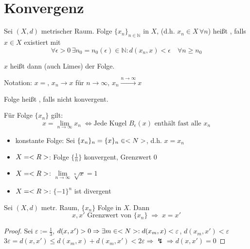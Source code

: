 \section{Konvergenz}\setcounter{theorem}{0}
\begin{definition}[konvergent]
	Sei $(X,d)$ metrischer Raum. Folge $\{x_n\}_{n\in\mathbb{N}}$ in $X$, (d.h. $x_n\in X\,\forall n$) heißt , falls $x\in X$ existiert mit \[\forall \epsilon > 0 \,\exists n_0=n_0(\epsilon)\in\mathbb{N}: d(x_n, x) < \epsilon\quad \forall n\ge n_0\]
	
	$x$ heißt dann  (auch Limes) der Folge.
	
	Notation: $x=$, $x_n\rightarrow x$ für $n\rightarrow\infty$, $x_n \overset{n\rightarrow\infty}{\longrightarrow}x$
	
	Folge heißt , falls nicht konvergent.
\end{definition}

\begin{conclusion}
	Für Folge $\{x_n\}$ gilt: \[ x=\lim\limits_{n\rightarrow\infty}x_n \;\Leftrightarrow \text{Jede Kugel $B_\epsilon(x)$ enthält fast alle $x_n$} \]
\end{conclusion}

\begin{example}
	\begin{itemize}
		\item konstante Folge: Sei $\{x_n\}_n=\{x\}_n\in<N>$, d.h. $x=x_n$
		\item $X=<R>$: Folge $\{\frac{1}{n}\}$ konvergent, Grenzwert 0
		\item $X=<R>$: $\lim\limits_{n\to\infty} \sqrt[n]{x}=1$
		\item $X=<R>$: $\{-1\}^n$ ist divergent
	\end{itemize}
\end{example}

\begin{proposition}
	Sei $(X,d)$ metr. Raum, $\{x_n\}$ Folge in $X$. Dann \[ x,x' \text{ Grenzwert von $\{x_n\}$} \;\Rightarrow\; x = x' \]
\end{proposition}
\begin{proof}
	Sei $\varepsilon:=\frac{1}{3}$, $d(x,x')>0\Rightarrow\exists m\in<N>:d(x_m,x)<\varepsilon$, $d(x_m,x')<\varepsilon$\\
	$3\varepsilon=d(x,x')\le d(x_m,x)+d(x_m,x')< 2\varepsilon\Rightarrow\lightning\Rightarrow d(x,x')=0$
\end{proof}

